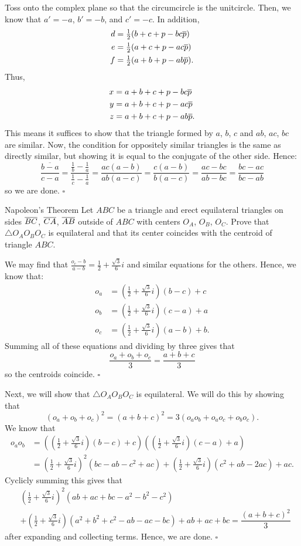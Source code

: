 \documentclass{article}
\begin{document}
Toss onto the complex plane so that the circumcircle is the unitcircle. Then, we know that $a' = -a$, $b' = -b$, and $c' = -c$. In addition, 
\begin{align*}
d &= \tfrac{1}{2}(b+c+p-bc\overline{p}) \\
e &= \tfrac{1}{2}(a+c+p-ac\overline{p}) \\
f &= \tfrac{1}{2}(a+b+p-ab\overline{p}).
\end{align*}
Thus,
\begin{align*}
x &= a+b+c+p-bc\overline{p} \\
y &= a+b+c+p-ac\overline{p} \\
z &= a+b+c+p-ab\overline{p}.
\end{align*}
This means it suffices to show that the triangle formed by $a$, $b$, $c$ and $ab$, $ac$, $bc$ are similar. Now, the condition for oppositely similar triangles is the same as directly similar, but showing it is equal to the conjugate of the other side. Hence: \[\overline{\dfrac{b-a}{c-a}} = \dfrac{\tfrac{1}{b}-\tfrac{1}{a}}{\tfrac{1}{c}-\tfrac{1}{a}} = \dfrac{ac(a-b)}{ab(a-c)} = \dfrac{c(a-b)}{b(a-c)} = \dfrac{ac-bc}{ab-bc} = \dfrac{bc-ac}{bc-ab}\] so we are done. $\square$

\begin{problem}[6.34]{Napoleon's Theorem}
Let $ABC$ be a triangle and erect equilateral triangles on sides $\overline{BC}$, $\overline{CA}$, $\overline{AB}$ outside of $ABC$ with centers $O_A$, $O_B$, $O_C$. Prove that $\triangle O_AO_BO_C$ is equilateral and that its center coincides with the centroid of triangle $ABC$.
\end{problem}

We may find that $\tfrac{o_c-b}{a-b} = \tfrac{1}{2}+\tfrac{\sqrt{3}}{6}i$ and similar equations for the others. Hence, we know that:
\begin{align*}
o_a &= (\tfrac{1}{2}+\tfrac{\sqrt{3}}{6}i)(b-c)+c \\
o_b &= (\tfrac{1}{2}+\tfrac{\sqrt{3}}{6}i)(c-a)+a \\
o_c &= (\tfrac{1}{2}+\tfrac{\sqrt{3}}{6}i)(a-b)+b.
\end{align*}
Summing all of these equations and dividing by three gives that \[\dfrac{o_a+o_b+o_c}{3} = \dfrac{a+b+c}{3}\] so the centroids coincide. $\square$

Next, we will show that $\triangle O_AO_BO_C$ is equilateral. We will do this by showing that \[(o_a+o_b+o_c)^2 = (a+b+c)^2 = 3(o_ao_b+o_ao_c+o_bo_c).\] We know that 
\begin{align*}
o_ao_b &= \left(\left(\tfrac{1}{2}+\tfrac{\sqrt{3}}{6}i\right)(b-c)+c\right)\left(\left(\tfrac{1}{2}+\tfrac{\sqrt{3}}{6}i\right)\left(c-a\right)+a\right) \\
&= \left(\tfrac{1}{2}+\tfrac{\sqrt{3}}{6}i\right)^2(bc-ab-c^2+ac)+\left(\tfrac{1}{2}+\tfrac{\sqrt{3}}{6}i\right)(c^2+ab-2ac)+ac.
\end{align*}
Cyclicly summing this gives that 
\begin{align*}
&\left(\tfrac{1}{2}+\tfrac{\sqrt{3}}{6}i\right)^2(ab+ac+bc-a^2-b^2-c^2)\\
&+\left(\tfrac{1}{2}+\tfrac{\sqrt{3}}{6}i\right)(a^2+b^2+c^2-ab-ac-bc)+ab+ac+bc = \dfrac{(a+b+c)^2}{3}
\end{align*}
after expanding and collecting terms. Hence, we are done. $\square$
\end{document}
